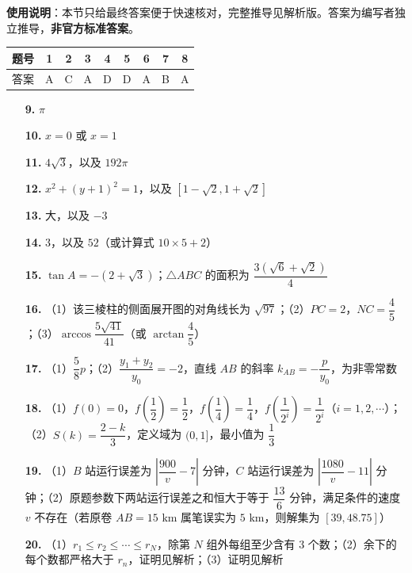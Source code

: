
\begin{gknotice}
\textbf{使用说明}：本节只给最终答案便于快速核对，完整推导见解析版。答案为编写者独立推导，\textbf{非官方标准答案}。
\end{gknotice}

\begin{center}\begin{tabular}{ccccccccc}
\toprule
题号 & 1 & 2 & 3 & 4 & 5 & 6 & 7 & 8 \\
\midrule
答案 & A & C & A & D & D & A & B & A \\
\bottomrule
\end{tabular}\end{center}

\begin{itemize}[leftmargin=2.6em]
  \item[\textbf{9.}] $\pi$
  \item[\textbf{10.}] $x=0$ 或 $x=1$
  \item[\textbf{11.}] $4\sqrt{3}$，以及 $192\pi$
  \item[\textbf{12.}] $x^2+(y+1)^2=1$，以及 $[1-\sqrt{2}, 1+\sqrt{2}]$
  \item[\textbf{13.}] 大，以及 $-3$
  \item[\textbf{14.}] $3$，以及 $52$（或计算式 $10\times 5+2$）
\end{itemize}

\begin{itemize}[leftmargin=2.6em]
  \item[\textbf{15.}] $\tan A=-(2+\sqrt{3})$；$\triangle ABC$ 的面积为 $\dfrac{3(\sqrt{6}+\sqrt{2})}{4}$
  \item[\textbf{16.}] （1）该三棱柱的侧面展开图的对角线长为 $\sqrt{97}$；（2）$PC=2$，$NC=\dfrac{4}{5}$；（3）$\arccos\dfrac{5\sqrt{41}}{41}$（或 $\arctan\dfrac{4}{5}$）
  \item[\textbf{17.}] （1）$\dfrac{5}{8}p$；（2）$\dfrac{y_1+y_2}{y_0}=-2$，直线 $AB$ 的斜率 $k_{AB}=-\dfrac{p}{y_0}$，为非零常数
  \item[\textbf{18.}] （1）$f(0)=0$，$f\left(\dfrac{1}{2}\right)=\dfrac{1}{2}$，$f\left(\dfrac{1}{4}\right)=\dfrac{1}{4}$，$f\left(\dfrac{1}{2^i}\right)=\dfrac{1}{2^i}$（$i=1, 2, \cdots$）；（2）$S(k)=\dfrac{2-k}{3}$，定义域为 $(0, 1]$，最小值为 $\dfrac{1}{3}$
  \item[\textbf{19.}] （1）$B$ 站运行误差为 $\left|\dfrac{900}{v}-7\right|$ 分钟，$C$ 站运行误差为 $\left|\dfrac{1080}{v}-11\right|$ 分钟；（2）原题参数下两站运行误差之和恒大于等于 $\dfrac{13}{6}$ 分钟，满足条件的速度 $v$ 不存在（若原卷 $AB=15\text{ km}$ 属笔误实为 $5\text{ km}$，则解集为 $[39, 48.75]$）
  \item[\textbf{20.}] （1）$r_1\le r_2\le \cdots \le r_N$，除第 $N$ 组外每组至少含有 $3$ 个数；（2）余下的每个数都严格大于 $r_n$，证明见解析；（3）证明见解析
\end{itemize}
